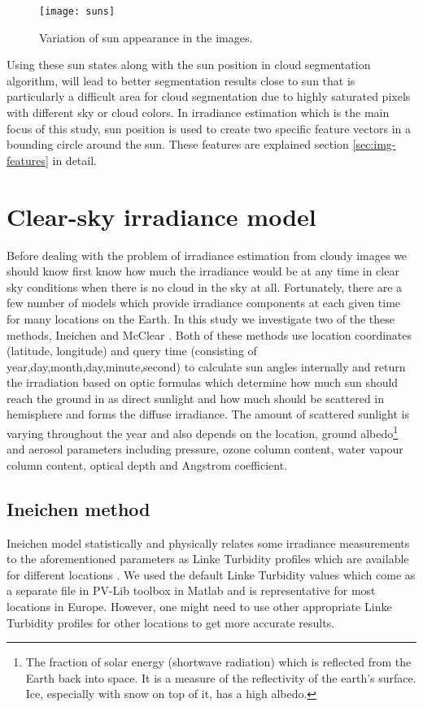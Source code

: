\begin{figure}[h]
\caption{Variation of sun appearance in the images.}
\label{fig:sun_variation}
\texttt{[image: suns]}
\centering
\end{figure}

Using these sun states along with the sun position in cloud segmentation algorithm, will lead to better segmentation results close to sun that is particularly a difficult area for cloud segmentation due to highly saturated pixels with different sky or cloud colors. In irradiance estimation which is the main focus of this study, sun position is used to create two specific feature vectors in a bounding circle around the sun. These features are explained section \ref{sec:img-features} in detail.

\section{Clear-sky irradiance model}
Before dealing with the problem of irradiance estimation from cloudy images we should know first know how much the irradiance would be at any time in clear sky conditions when there is no cloud in the sky at all. Fortunately, there are a few number of models which provide irradiance components at each given time for many locations on the Earth. In this study we investigate two of the these methods, Ineichen \cite{clear_sky_model} and McClear \cite{mcclear_alg}. Both of these methods use location coordinates (latitude, longitude) and query time (consisting of year,day,month,day,minute,second) to calculate sun angles internally and return the irradiation based on optic formulas which determine how much sun should reach the ground in as direct sunlight and how much should be scattered in hemisphere and forms the diffuse irradiance. The amount of scattered sunlight is varying throughout the year and also depends on the location, ground albedo\footnote{The fraction of solar energy (shortwave radiation) which is reflected from the Earth back into space. It is a measure of the reflectivity of the earth's surface. Ice, especially with snow on top of it, has a high albedo.} and aerosol parameters including pressure, ozone column content, water vapour column content,  optical depth and Angstrom coefficient. 

\subsection{Ineichen method}
Ineichen model statistically and physically relates some irradiance measurements to the aforementioned parameters as Linke Turbidity profiles which are available for different locations . We used the default Linke Turbidity values which come as a separate file in PV-Lib toolbox \cite{pv_lib_toolbox} in Matlab and is representative for most locations in Europe. However, one might need to use other appropriate Linke Turbidity profiles for other locations to get more accurate results.
 
